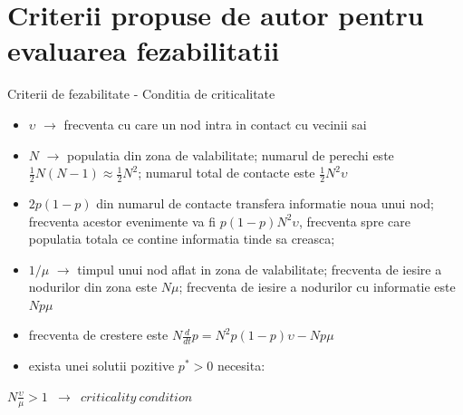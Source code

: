 \documentclass{beamer}
\begin{document}
\section {Criterii propuse de autor pentru evaluarea fezabilitatii}
\begin{frame}{Criterii de fezabilitate - Conditia de criticalitate}
	\begin{itemize}
	  \item $\upsilon$ $\rightarrow$ frecventa cu care un nod intra in contact cu
	  vecinii sai
	  \item $N$ $\rightarrow$ populatia din zona de valabilitate; numarul de
	  perechi este $\frac{1}{2}N(N-1) \approx \frac{1}{2}N^2$; numarul total de
	  contacte este $\frac{1}{2}N^2\upsilon$
	  \item $2p(1-p)$ din numarul de contacte transfera informatie noua unui nod;
	  frecventa acestor evenimente va fi $p(1-p)N^2\upsilon$, frecventa spre care
	  populatia totala ce contine informatia tinde sa creasca;
	  \item $1/\mu$ $\rightarrow$ timpul unui nod aflat in zona de valabilitate;
	  frecventa de iesire a nodurilor din zona este $N\mu$; frecventa de iesire a
	  nodurilor cu informatie este $Np\mu$
	  \item frecventa de crestere este $N\frac{d}{dt}p = N^2p(1-p)\upsilon - Np\mu$
	  \item exista unei solutii pozitive $p^* > 0$ necesita:
	\end{itemize}
	\hskip0.5in
	\small{
		\begin{beamerboxesrounded}[lower=block body,shadow=true,width=3.2in]{}
			\begin{center}
				\texttt{$N\frac{\upsilon}{\mu} > 1$ $\rightarrow$ $criticality\ condition$}
			\end{center}
		\end{beamerboxesrounded}
	}
\end{frame}
\end{document}
